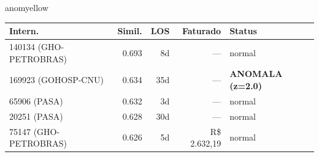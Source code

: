 \documentclass[a4paper,10pt]{article}
\begin{document}
\begin{anomalycard}[Internacao 119384 | GHO-PETROBRAS | MODERADO (z=2.46)]{anomyellow}
\begin{tabular}{l r r r l}\toprule\textbf{Intern.} & \textbf{Simil.} & \textbf{LOS} & \textbf{Faturado} & \textbf{Status} \\\midrule
140134 (GHO-PETROBRAS) & 0.693 & 8d & --- & \textcolor{jcubeblue}{normal} \\
169923 (GOHOSP-CNU) & 0.634 & 35d & --- & \textcolor{anomred}{\textbf{ANOMALA (z=2.0)}} \\
65906 (PASA) & 0.632 & 3d & --- & \textcolor{jcubeblue}{normal} \\
20251 (PASA) & 0.628 & 30d & --- & \textcolor{jcubeblue}{normal} \\
75147 (GHO-PETROBRAS) & 0.626 & 5d & R\$ 2.632,19 & \textcolor{jcubeblue}{normal} \\
\bottomrule\end{tabular}


\end{anomalycard}

\newpage
\end{document}
